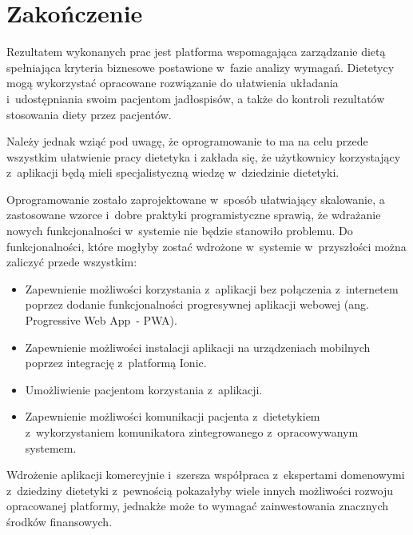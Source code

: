 \chapter*{Zakończenie}\label{ch:ending}
Rezultatem wykonanych prac jest platforma wspomagająca zarządzanie dietą spełniająca kryteria biznesowe postawione w~fazie analizy wymagań.
Dietetycy mogą wykorzystać opracowane rozwiązanie do ułatwienia układania i~udostępniania swoim pacjentom jadłospisów,
a także do kontroli rezultatów stosowania diety przez pacjentów.

\par
Należy jednak wziąć pod uwagę, że oprogramowanie to ma na celu przede wszystkim ułatwienie pracy dietetyka
i zakłada się, że użytkownicy korzystający z~aplikacji będą mieli specjalistyczną wiedzę w~dziedzinie dietetyki.

\par
Oprogramowanie zostało zaprojektowane w~sposób ułatwiający skalowanie,
a zastosowane wzorce i~dobre praktyki programistyczne sprawią, że wdrażanie nowych funkcjonalności w~systemie nie będzie stanowiło problemu.
Do funkcjonalności, które mogłyby zostać wdrożone w~systemie w~przyszłości można zaliczyć przede wszystkim:
\begin{itemize}
    \item Zapewnienie możliwości korzystania z~aplikacji bez połączenia z~internetem poprzez dodanie funkcjonalności progresywnej aplikacji webowej (ang. Progressive Web App~- PWA)\cite{url:pwa}.
    \item Zapewnienie możliwości instalacji aplikacji na urządzeniach mobilnych poprzez integrację z~platformą Ionic\cite{tech:ionic}.
    \item Umożliwienie pacjentom korzystania z~aplikacji.
    \item Zapewnienie możliwości komunikacji pacjenta z~dietetykiem z~wykorzystaniem komunikatora zintegrowanego z~opracowywanym systemem.
\end{itemize}

\par
Wdrożenie aplikacji komercyjnie i~szersza współpraca z~ekspertami domenowymi z~dziedziny dietetyki z~pewnością pokazałyby wiele innych możliwości rozwoju opracowanej platformy,
jednakże może to wymagać zainwestowania znacznych środków finansowych.
\thispagestyle{normal}
